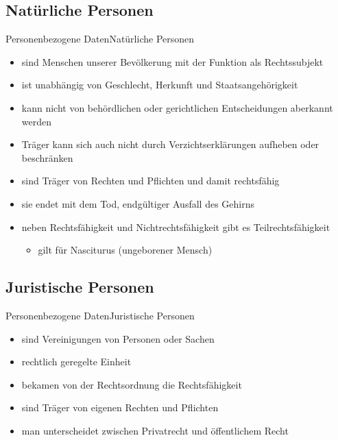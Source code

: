 \documentclass[9pt]{beamer}
\begin{document}
        \subsection{Natürliche Personen}
            \begin{frame}{Personenbezogene Daten}{Natürliche Personen}
                \begin{itemize}
            		\item sind Menschen unserer Bevölkerung mit der Funktion als Rechtssubjekt
            		\item ist unabhängig von Geschlecht, Herkunft und Staatsangehörigkeit
            		\item kann nicht von behördlichen oder gerichtlichen Entscheidungen aberkannt werden
            		\item Träger kann sich auch nicht durch Verzichtserklärungen aufheben oder beschränken
            		\item sind Träger von Rechten und Pflichten und damit rechtsfähig
            		\item sie endet mit dem Tod, endgültiger Ausfall des Gehirns
            		\item neben Rechtsfähigkeit und Nichtrechtsfähigkeit gibt es Teilrechtsfähigkeit
            		    \begin{itemize}
                            \item gilt für Nasciturus (ungeborener Mensch)
                        \end{itemize}
            	\end{itemize}
            \end{frame}


        \subsection{Juristische Personen}        
            \begin{frame}{Personenbezogene Daten}{Juristische Personen}
                \begin{itemize}
            		\item sind Vereinigungen von Personen oder Sachen
            		\item rechtlich geregelte Einheit
            		\item bekamen von der Rechtsordnung die Rechtsfähigkeit
            		\item sind Träger von eigenen Rechten und Pflichten
            		\item man unterscheidet zwischen Privatrecht und öffentlichem Recht
            	\end{itemize}
            \end{frame}
\end{document}
